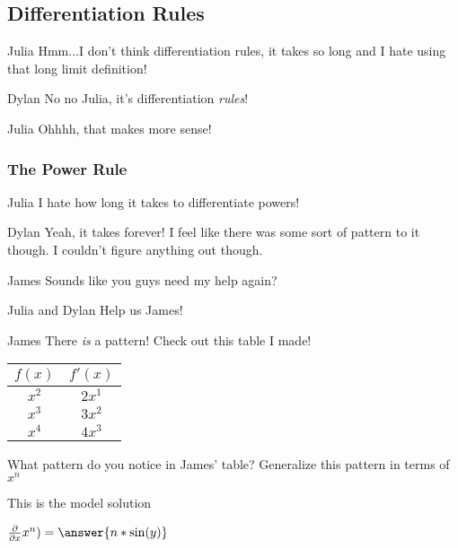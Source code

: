 \documentclass{ximera}
\begin{document}
\subsection{Differentiation Rules}
\begin{dialogue}
\item[Julia] Hmm...I don't think differentiation rules, it takes so long and I hate using that long limit definition!
\item[Dylan] No no Julia, it's differentiation \textit{rules}!
\item[Julia] Ohhhh, that makes more sense!

\end{dialogue}
\subsubsection{The Power Rule}
\begin{dialogue}
\item[Julia] I hate how long it takes to differentiate powers!
\item[Dylan] Yeah, it takes forever! I feel like there was some sort of pattern to it though. I couldn't figure anything out though.
\item[James] Sounds like you guys need my help again?
\item[Julia and Dylan] Help us James!
\item[James] There \textit{is} a pattern! Check out this table I made!
\begin{center}
\begin{tabular}{c|c}
$f(x)$ & $f'(x)$ \\
\hline
$x^2$ & $2x^1$ \\
$x^3$ & $3x^2$ \\
$x^4$ & $4x^3$ 
\end{tabular}
\end{center}
\end{dialogue}
\begin{question}
What pattern do you notice in James' table? Generalize this pattern in terms of $x^n$
\begin{freeResponse}
This is the model solution %
\end{freeResponse}
\end{question}
\begin{question}
$ \frac{\partial}{\partial x} x^n) =  \answer{n*\sin(y)}$
\end{question}
\end{document}
